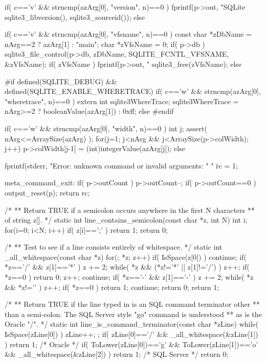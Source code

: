 \begin{Codex}[label=shell.c,numbers=left]
{  if( c=='v' && strncmp(azArg[0], "version", n)==0 ){
    fprintf(p->out, "SQLite %
        sqlite3_libversion(), sqlite3_sourceid());
  }else

  if( c=='v' && strncmp(azArg[0], "vfsname", n)==0 ){
    const char *zDbName = nArg==2 ? azArg[1] : "main";
    char *zVfsName = 0;
    if( p->db ){
      sqlite3_file_control(p->db, zDbName, SQLITE_FCNTL_VFSNAME, &zVfsName);
      if( zVfsName ){
        fprintf(p->out, "%
        sqlite3_free(zVfsName);
      }
    }
  }else

#if defined(SQLITE_DEBUG) && defined(SQLITE_ENABLE_WHERETRACE)
  if( c=='w' && strncmp(azArg[0], "wheretrace", n)==0 ){
    extern int sqlite3WhereTrace;
    sqlite3WhereTrace = nArg>=2 ? booleanValue(azArg[1]) : 0xff;
  }else
#endif

  if( c=='w' && strncmp(azArg[0], "width", n)==0 ){
    int j;
    assert( nArg<=ArraySize(azArg) );
    for(j=1; j<nArg && j<ArraySize(p->colWidth); j++){
      p->colWidth[j-1] = (int)integerValue(azArg[j]);
    }
  }else

  {
    fprintf(stderr, "Error: unknown command or invalid arguments: "
      " \"%
    rc = 1;
  }

meta_command_exit:
  if( p->outCount ){
    p->outCount--;
    if( p->outCount==0 ) output_reset(p);
  }
  return rc;
}

/*
** Return TRUE if a semicolon occurs anywhere in the first N characters
** of string z[].
*/
static int line_contains_semicolon(const char *z, int N){
  int i;
  for(i=0; i<N; i++){  if( z[i]==';' ) return 1; }
  return 0;
}

/*
** Test to see if a line consists entirely of whitespace.
*/
static int _all_whitespace(const char *z){
  for(; *z; z++){
    if( IsSpace(z[0]) ) continue;
    if( *z=='/' && z[1]=='*' ){
      z += 2;
      while( *z && (*z!='*' || z[1]!='/') ){ z++; }
      if( *z==0 ) return 0;
      z++;
      continue;
    }
    if( *z=='-' && z[1]=='-' ){
      z += 2;
      while( *z && *z!='\n' ){ z++; }
      if( *z==0 ) return 1;
      continue;
    }
    return 0;
  }
  return 1;
}

/*
** Return TRUE if the line typed in is an SQL command terminator other
** than a semi-colon.  The SQL Server style "go" command is understood
** as is the Oracle "/".
*/
static int line_is_command_terminator(const char *zLine){
  while( IsSpace(zLine[0]) ){ zLine++; };
  if( zLine[0]=='/' && _all_whitespace(&zLine[1]) ){
    return 1;  /* Oracle */
  }
  if( ToLower(zLine[0])=='g' && ToLower(zLine[1])=='o'
         && _all_whitespace(&zLine[2]) ){
    return 1;  /* SQL Server */
  }
  return 0;
}


\end{Codex}
